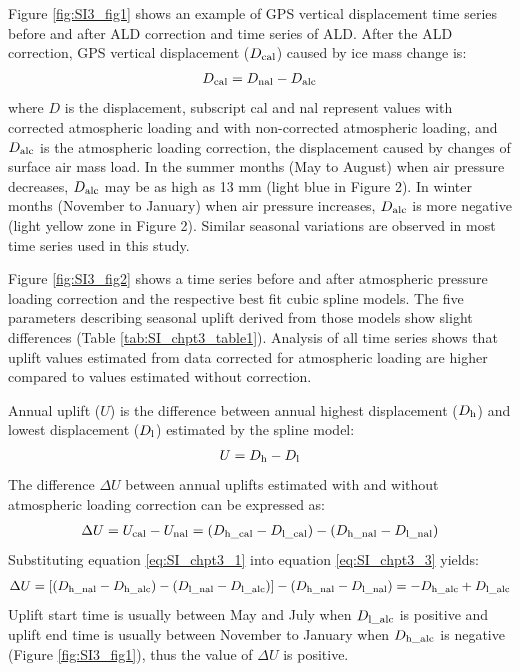 Figure \ref{fig:SI3_fig1} shows an example of GPS vertical displacement time series before and after ALD correction and time series of ALD.  After the ALD correction, GPS vertical displacement ($D_{\textup{cal}}$) caused by ice mass change is:  
\begin{equation} \label{eq:SI_chpt3_1}
\begin{aligned}
D_{\textup{cal}}=D_{\textup{nal}}-D_{\textup{alc}}
\end{aligned}
\end{equation}
where $D$ is the displacement, subscript cal and nal represent values with corrected atmospheric loading and with non-corrected atmospheric loading, and $D_{\textup{alc}}$ is the atmospheric loading correction, the displacement caused by changes of surface air mass load.  In the summer months (May to August) when air pressure decreases, $D_{\textup{alc}}$ may be as high as 13 mm (light blue in Figure 2).  In winter months (November to January) when air pressure increases, $D_{\textup{alc}}$ is more negative (light yellow zone in Figure 2).  Similar seasonal variations are observed in most time series used in this study.

Figure \ref{fig:SI3_fig2} shows a time series before and after atmospheric pressure loading correction and the respective best fit cubic spline models.  The five parameters describing seasonal uplift derived from those models show slight differences (Table \ref{tab:SI_chpt3_table1}).  Analysis of all time series shows that uplift values estimated from data corrected for atmospheric loading are higher compared to values estimated without correction.

Annual uplift ($U$) is the difference between annual highest displacement ($D_{\textup{h}}$) and lowest displacement ($D_{\textup{l}}$) estimated by the spline model:
\begin{equation} \label{eq:SI_chpt3_2}
\begin{aligned}
U=D_{\textup{h}}-D_{\textup{l}}
\end{aligned}
\end{equation}
The difference $\Delta U$ between annual uplifts estimated with and without atmospheric loading correction can be expressed as:
\begin{equation} \label{eq:SI_chpt3_3}
\begin{aligned}
\Delta U=U_{\textup{cal}}-U_{\textup{nal}}=(D_{\textup{h\_cal}}-D_{\textup{l\_cal}})-(D_{\textup{h\_nal}}-D_{\textup{l\_nal}})
\end{aligned}
\end{equation}
Substituting equation \ref{eq:SI_chpt3_1} into equation \ref{eq:SI_chpt3_3} yields:
\begin{equation} \label{eq:SI_chpt3_4}
\begin{aligned}
\Delta U=[(D_{\textup{h\_nal}}-D_{\textup{h\_alc}})-(D_{\textup{l\_nal}}-D_{\textup{l\_alc}})]-(D_{\textup{h\_nal}}-D_{\textup{l\_nal}})=-D_{\textup{h\_alc}}+D_{\textup{l\_alc}}
\end{aligned}
\end{equation}
Uplift start time is usually between May and July when $D_{\textup{l\_alc}}$ is positive and uplift end time is usually between November to January when $D_{\textup{h\_alc}}$ is negative (Figure \ref{fig:SI3_fig1}), thus the value of $\Delta U$ is positive.


